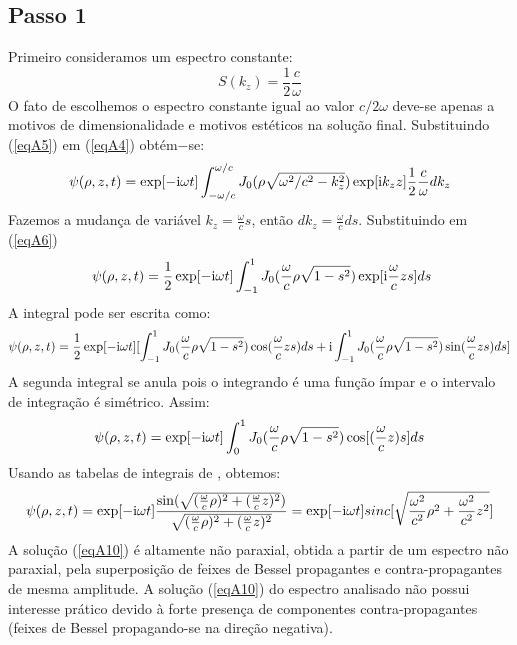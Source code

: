 \subsection{Passo 1}
Primeiro consideramos um espectro constante:
\begin{equation}\label{eqA5}
    S(k_{z})=\frac{1}{2}\frac{c}{\omega}
\end{equation}
O fato de escolhemos o espectro constante igual ao valor $c/2\omega$ deve-se apenas a motivos de dimensionalidade e  motivos estéticos na solução final. Substituindo (\ref{eqA5}) em (\ref{eqA4}) obtém$-$se:
\begin{equation}\label{eqA6}
\psi(\rho,z,t)=\exp[-{\rm i}\omega t]\int_{-\omega/c}^{\omega/c}J_0(\rho\sqrt{\omega^2/c^2-k_{z}^2})\exp[{\rm i}k_{z}z]
\frac{1}{2}\frac{c}{\omega}dk_{z}
\end{equation}
Fazemos a mudança de variável $k_{z}=\frac{\omega}{c}s$, então $dk_{z}=\frac{\omega}{c}ds$. Substituindo em (\ref{eqA6})
\begin{equation}\label{eqA7}
\ \psi(\rho,z,t)=\frac{1}{2}\exp[-{\rm i}\omega t]\int_{-1}^{1}J_0(\frac{\omega}{c}\rho\sqrt{1-s^2})
\exp[{\rm i}\frac{\omega}{c}zs]ds
\end{equation}
A integral pode ser escrita como:
\begin{equation}\label{eqA8}
    \psi(\rho,z,t)=\frac{1}{2}\exp[-{\rm i}\omega t][\int_{-1}^{1}J_0(\frac{\omega}{c}\rho\sqrt{1-s^2})\cos(\frac{\omega}{c}zs)ds
+{\rm i}\int_{-1}^{1}J_0(\frac{\omega}{c}\rho\sqrt{1-s^2})\sin(\frac{\omega}{c}zs)ds ]
\end{equation}
A segunda integral se anula pois o integrando é uma função ímpar e o intervalo de integração é simétrico. Assim:
\begin{equation}\label{eqA9}
    \psi(\rho,z,t)=\exp[-{\rm i}\omega t]\int_{0}^{1}J_0(\frac{\omega}{c}\rho\sqrt{1-s^2})
\cos[(\frac{\omega}{c}z)s]ds
\end{equation}
Usando as tabelas de integrais de \cite{Lya:23}, obtemos: 
\begin{equation}\label{eqA10}
 \psi(\rho,z,t)=\exp[-{\rm i}\omega t]\frac{\sin(\sqrt{(\frac{\omega}{c}\rho)^2+(\frac{\omega}{c}z)^2})}{\sqrt{(\frac{\omega}{c}\rho)^2+(\frac{\omega}{c}z)^2}} 
=\exp[-{\rm i}\omega t]sinc[\sqrt{\frac{\omega^2}{c^2}\rho^2+\frac{\omega^2}{c^2}z^2}]
\end{equation}
A solução (\ref{eqA10}) é altamente não paraxial, obtida a partir de um espectro não paraxial, pela superposição de feixes de Bessel propagantes e contra-propagantes de mesma amplitude. A solução (\ref{eqA10}) do espectro analisado n\~ao possui interesse prático devido à forte presença de componentes contra-propagantes (feixes de Bessel propagando-se na direção negativa). 
